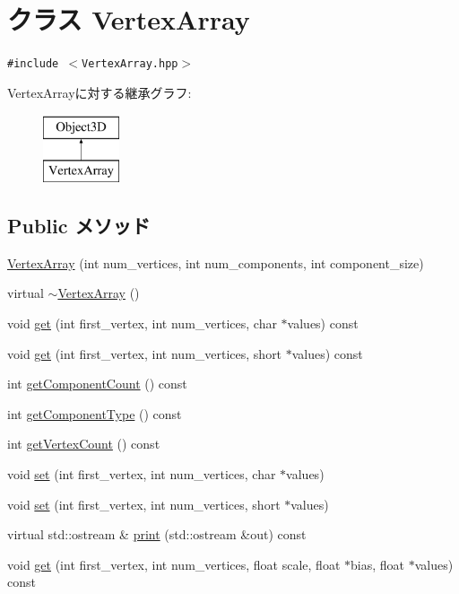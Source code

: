 \hypertarget{classm3g_1_1VertexArray}{
\section{クラス VertexArray}
\label{classm3g_1_1VertexArray}
}
{\tt \#include $<$VertexArray.hpp$>$}

VertexArrayに対する継承グラフ:\begin{figure}[H]
\begin{center}
\leavevmode
\includegraphics[height=2cm]{classm3g_1_1VertexArray}
\end{center}
\end{figure}
\subsection*{Public メソッド}
\begin{CompactItemize}
\item 
\hyperlink{classm3g_1_1VertexArray_5f38e30d23b5dc34b223e749e8afd0d0}{VertexArray} (int num\_\-vertices, int num\_\-components, int component\_\-size)
\item 
virtual \hyperlink{classm3g_1_1VertexArray_267fa63cb2f4216729437dc826415911}{$\sim$VertexArray} ()
\item 
void \hyperlink{classm3g_1_1VertexArray_9d1b801a7c196a07553a5ef4a5473573}{get} (int first\_\-vertex, int num\_\-vertices, char $\ast$values) const 
\item 
void \hyperlink{classm3g_1_1VertexArray_575822f60d7b5e74ed51e94851123038}{get} (int first\_\-vertex, int num\_\-vertices, short $\ast$values) const 
\item 
int \hyperlink{classm3g_1_1VertexArray_7016f51d2788e78fdd736efd040f5e5e}{getComponentCount} () const 
\item 
int \hyperlink{classm3g_1_1VertexArray_9b7b78fbff0603779ec6bdd2a323c939}{getComponentType} () const 
\item 
int \hyperlink{classm3g_1_1VertexArray_c1c9b7f5b0dcd9c0310d7e77e10081ba}{getVertexCount} () const 
\item 
void \hyperlink{classm3g_1_1VertexArray_501a9e6d9b5190b0a9dbfe58a6fd9d2e}{set} (int first\_\-vertex, int num\_\-vertices, char $\ast$values)
\item 
void \hyperlink{classm3g_1_1VertexArray_ac10afe01263d9ac5e7f972a7263de4a}{set} (int first\_\-vertex, int num\_\-vertices, short $\ast$values)
\item 
virtual std::ostream \& \hyperlink{classm3g_1_1VertexArray_6fea17fa1532df3794f8cb39cb4f911f}{print} (std::ostream \&out) const 
\item 
void \hyperlink{classm3g_1_1VertexArray_1adedf59e0c6a047242a3914ca52b929}{get} (int first\_\-vertex, int num\_\-vertices, float scale, float $\ast$bias, float $\ast$values) const 
\end{CompactItemize}
